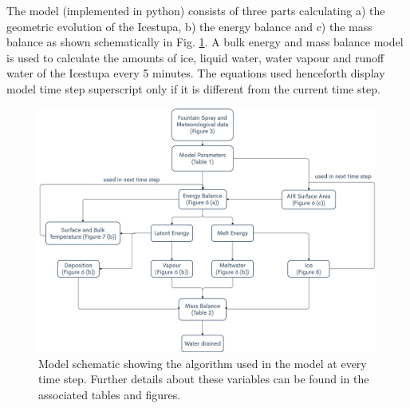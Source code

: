 \documentclass[utf8]{frontiersSCNS} %
\begin{document}
The model (implemented in python) consists of three parts calculating a) the geometric evolution of the Icestupa, b)
the energy balance and c) the mass balance as shown schematically in Fig. \ref{fig:schema}. A bulk energy and mass
balance model is used to calculate the amounts of ice, liquid water, water vapour and runoff water of the Icestupa
every 5 minutes. The equations used henceforth display model time step superscript only if it is different from the
current time step.

  \begin{figure} \begin{center} \includegraphics[width=15 cm]{Figures/Figure_4.jpg} \end{center} \caption{Model
schematic showing the algorithm used in the model at every time step. Further details about these variables can be
found in the associated tables and figures.} \label{fig:schema} \end{figure}
\end{document}
